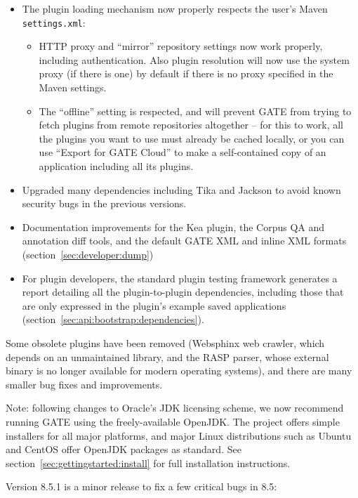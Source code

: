 \begin{itemize}
\item The plugin loading mechanism now properly respects the user's Maven
  \verb!settings.xml!:
  \begin{itemize}
  \item HTTP proxy and ``mirror'' repository settings now work properly,
  including authentication.  Also plugin resolution will now use the system
  proxy (if there is one) by default if there is no proxy specified in the
  Maven settings.
  \item The ``offline'' setting is respected, and will prevent GATE from trying
  to fetch plugins from remote repositories altogether -- for this to work, all
  the plugins you want to use must already be cached locally, or you can use
  ``Export for GATE Cloud'' to make a self-contained copy of an application
  including all its plugins.
  \end{itemize}
\item Upgraded many dependencies including Tika and Jackson to avoid known
  security bugs in the previous versions.
\item Documentation improvements for the Kea plugin, the Corpus QA and
  annotation diff tools, and the default GATE XML and inline XML formats
  (section~\ref{sec:developer:dump})
\item For plugin developers, the standard plugin testing framework generates a
  report detailing all the plugin-to-plugin dependencies, including those that
  are only expressed in the plugin's example saved applications
  (section~\ref{sec:api:bootstrap:dependencies}).
\end{itemize}

Some obsolete plugins have been removed (Websphinx web crawler, which depends
on an unmaintained library, and the RASP parser, whose external binary is no
longer available for modern operating systems), and there are many smaller bug
fixes and improvements.

Note: following changes to Oracle's JDK licensing scheme, we now recommend
running GATE using the freely-available OpenJDK.  The
 project offers simple
installers for all major platforms, and major Linux distributions such as
Ubuntu and CentOS offer OpenJDK packages as standard.  See
section~\ref{sec:gettingstarted:install} for full installation instructions.


Version 8.5.1 is a minor release to fix a few critical bugs in 8.5:

